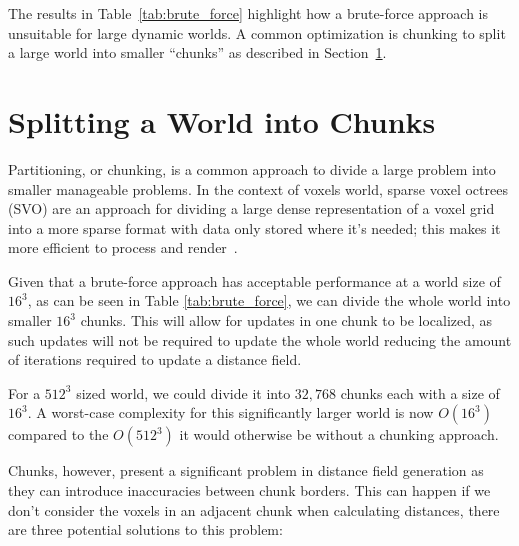 The results in Table~\ref{tab:brute_force} highlight how a brute-force approach is unsuitable for large dynamic worlds.
A common optimization is chunking to split a large world into smaller ``chunks'' as described in
Section~\ref{sec:chunking}.

\section{Splitting a World into Chunks} \label{sec:chunking}
Partitioning, or chunking, is a common approach to divide a large problem into smaller manageable problems. In the
context of voxels world, sparse voxel octrees (SVO) are an approach for dividing a large dense representation of a voxel
grid into a more sparse format with data only stored where it's needed; this makes it more efficient to process and
render~\cite{laine2010efficient,mileff2019simplified,van2015real}.

Given that a brute-force approach has acceptable performance at a world size of \(16^3\), as can be seen in Table
\ref{tab:brute_force}, we can divide the whole world into smaller \(16^3\) chunks. This will allow for updates in one
chunk to be localized, as such updates will not be required to update the whole world reducing the amount of iterations
required to update a distance field.

For a \(512^3\) sized world, we could divide it into \(32,768\) chunks each with a size of \(16^3\). A worst-case
complexity for this significantly larger world is now \(O(16^3)\) compared to the \(O(512^3)\) it would otherwise be
without a chunking approach.

Chunks, however, present a significant problem in distance field generation as they can introduce inaccuracies between
chunk borders. This can happen if we don't consider the voxels in an adjacent chunk when calculating distances, there
are three potential solutions to this problem:


